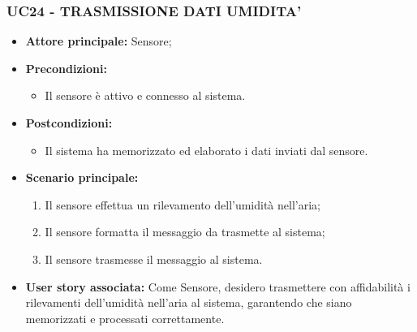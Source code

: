\subsubsection{UC24 - TRASMISSIONE DATI UMIDITA'}
\begin{itemize}
    \item \textbf{Attore principale:} Sensore;
    \item \textbf{Precondizioni:}
        \begin{itemize}
            \item Il sensore è attivo e connesso al sistema. 
        \end{itemize}
    \item \textbf{Postcondizioni:}
        \begin{itemize}
            \item Il sistema ha memorizzato ed elaborato i dati inviati dal sensore.
        \end{itemize}
    \item \textbf{Scenario principale:}
        \begin{enumerate}
            \item Il sensore effettua un rilevamento dell'umidità nell'aria;
            \item Il sensore formatta il messaggio da trasmette al sistema;
            \item Il sensore trasmesse il messaggio al sistema.
        \end{enumerate}
    \item \textbf{User story associata:}
    Come Sensore, desidero trasmettere con affidabilità i rilevamenti dell'umidità nell'aria al sistema, garantendo che siano memorizzati e processati correttamente.
\end{itemize}
